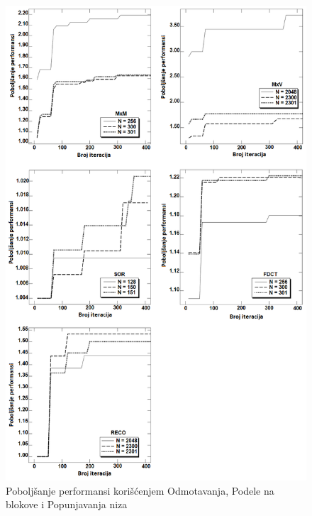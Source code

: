 \documentclass[a4paper]{article}
\begin{document}
\begin{figure}[p]
\begin{center}
\includegraphics[width=\textwidth]{performanse2}
\end{center}
\caption{Poboljšanje performansi korišćenjem Odmotavanja, Podele na blokove i Popunjavanja niza}
\label{fig:slika3}
\end{figure}
\end{document}
